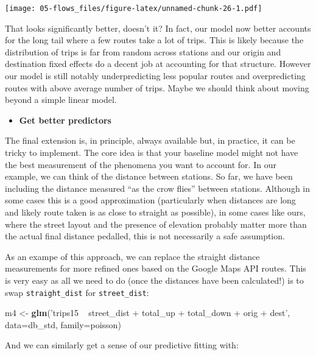 \documentclass[
]{book}
\newenvironment{Shaded}{\begin{snugshade}}{\end{snugshade}}
\newcommand{\DataTypeTok}[1]{\textcolor[rgb]{0.13,0.29,0.53}{#1}}
\newcommand{\KeywordTok}[1]{\textcolor[rgb]{0.13,0.29,0.53}{\textbf{#1}}}
\newcommand{\NormalTok}[1]{#1}
\newcommand{\StringTok}[1]{\textcolor[rgb]{0.31,0.60,0.02}{#1}}
\providecommand{\tightlist}{%
  \setlength{\itemsep}{0pt}\setlength{\parskip}{0pt}}
\begin{document}
\texttt{[image: 05-flows\_files/figure-latex/unnamed-chunk-26-1.pdf]}

That looks significantly better, doesn't it? In fact, our model now better accounts for the long tail where a few routes take a lot of trips. This is likely because the distribution of trips is far from random across stations and our origin and destination fixed effects do a decent job at accounting for that structure. However our model is still notably underpredicting less popular routes and overpredicting routes with above average number of trips. Maybe we should think about moving beyond a simple linear model.

\begin{itemize}
\tightlist
\item
  \textbf{Get better predictors}
\end{itemize}

The final extension is, in principle, always available but, in practice, it can be tricky to implement. The core idea is that your baseline model might not have the best measurement of the phenomena you want to account for. In our example, we can think of the distance between stations. So far, we have been including the distance measured ``as the crow flies'' between stations. Although in some cases this is a good approximation (particularly when distances are long and likely route taken is as close to straight as possible), in some cases like ours, where the street layout and the presence of elevation probably matter more than the actual final distance pedalled, this is not necessarily a safe assumption.

As an exampe of this approach, we can replace the straight distance measurements for more refined ones based on the Google Maps API routes. This is very easy as all we need to do (once the distances have been calculated!) is to swap \texttt{straight\_dist} for \texttt{street\_dist}:

\begin{Shaded}
\begin{Highlighting}[]
\NormalTok{m4 <-}\StringTok{ }\KeywordTok{glm}\NormalTok{(}\StringTok{'trips15 ~ street_dist + total_up + total_down + orig + dest'}\NormalTok{, }
          \DataTypeTok{data=}\NormalTok{db_std,}
          \DataTypeTok{family=}\NormalTok{poisson)}
\end{Highlighting}
\end{Shaded}

And we can similarly get a sense of our predictive fitting with:
\end{document}
